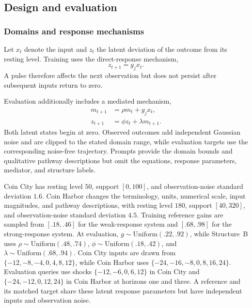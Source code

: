 \subsection{Design and evaluation}
\label{app:exp3-coin-structural}

\subsubsection{Domains and response mechanisms}
\label{app:exp3-domain-contrast}

Let \(x_t\) denote the input and \(z_t\) the latent deviation of the outcome from its resting level.
Training uses the direct-response mechanism,
\begin{equation}
z_{t+1}=g_jx_t.
\label{eq:exp3-coin-a}
\end{equation}
A pulse therefore affects the next observation but does not persist after subsequent inputs return to zero.

Evaluation additionally includes a mediated mechanism,
\begin{align}
m_{t+1}&=\rho m_t+g_jx_t,\\
z_{t+1}&=\phi z_t+\lambda m_{t+1}.
\label{eq:exp3-coin-b}
\end{align}
Both latent states begin at zero.
Observed outcomes add independent Gaussian noise and are clipped to the stated domain range, while evaluation targets use the corresponding noise-free trajectory.
Prompts provide the domain bounds and qualitative pathway descriptions but omit the equations, response parameters, mediator, and structure labels.

Coin City has resting level \(50\), support \([0,100]\), and observation-noise standard deviation \(1.6\).
Coin Harbor changes the terminology, units, numerical scale, input magnitudes, and pathway descriptions, with resting level \(180\), support \([40,320]\), and observation-noise standard deviation \(4.5\).
Training reference gains are sampled from \([.18,.46]\) for the weak-response system and \([.68,.98]\) for the strong-response system.
At evaluation, \(g\sim\mathrm{Uniform}(.22,.92)\), while Structure~B uses \(\rho\sim\mathrm{Uniform}(.48,.74)\), \(\phi\sim\mathrm{Uniform}(.18,.42)\), and \(\lambda\sim\mathrm{Uniform}(.68,.94)\).
Coin City inputs are drawn from \(\{-12,-8,-4,0,4,8,12\}\), while Coin Harbor uses \(\{-24,-16,-8,0,8,16,24\}\).
Evaluation queries use shocks \(\{-12,-6,0,6,12\}\) in Coin City and \(\{-24,-12,0,12,24\}\) in Coin Harbor at horizons one and three.
A reference and its matched target share these latent response parameters but have independent inputs and observation noise.

